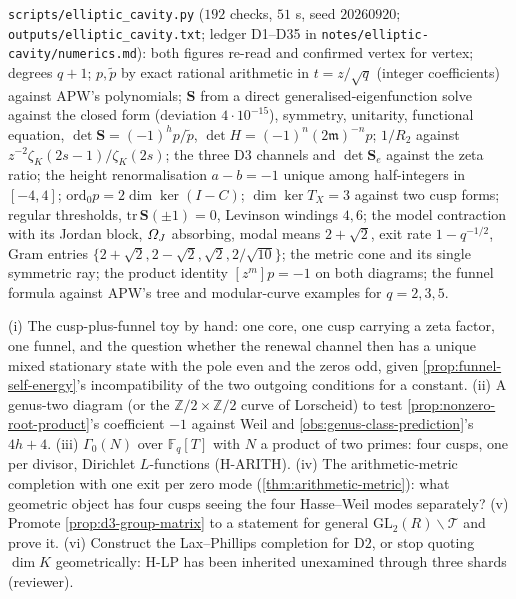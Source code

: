 \begin{numerical}
\label{num:elliptic-cavity}
\texttt{scripts/elliptic\_cavity.py} ($192$ checks, $51$ s, seed $20260920$; \texttt{outputs/elliptic\_cavity.txt};
ledger D1--D35 in \texttt{notes/elliptic-cavity/numerics.md}): both figures re-read and confirmed vertex for vertex;
degrees $q+1$; $p,\tilde p$ by exact rational arithmetic in $t = z/\sqrt q$ (integer coefficients) against APW's
polynomials; $\mathbf S$ from a direct generalised-eigenfunction solve against the closed form (deviation
$4\cdot10^{-15}$), symmetry, unitarity, functional equation, $\det\mathbf S = (-1)^hp/\tilde p$, $\det H = (-1)^n(2\mathfrak m)^{-n}p$;
$1/R_2$ against $z^{-2}\zeta_K(2s-1)/\zeta_K(2s)$; the three $\mathrm{D3}$ channels and $\det\mathbf S_e$ against the
zeta ratio; the height renormalisation $a-b = -1$ unique among half-integers in $[-4,4]$; $\mathrm{ord}_0p = 2\dim\ker(I-C)$;
$\dim\ker T_X = 3$ against two cusp forms; regular thresholds, $\mathrm{tr}\,\mathbf S(\pm1) = 0$, Levinson windings $4,6$;
the model contraction with its Jordan block, $\varOmega_J$ absorbing, modal means $2+\sqrt2$, exit rate $1-q^{-1/2}$,
Gram entries $\{2+\sqrt2,2-\sqrt2,\sqrt2,2/\sqrt{10}\}$; the metric cone and its single symmetric ray; the product
identity $[z^m]p = -1$ on both diagrams; the funnel formula against APW's tree and modular-curve examples for
$q = 2,3,5$.
\end{numerical}

\begin{observation}
\label{obs:elliptic-cavity-next}
(i) The cusp-plus-funnel toy by hand: one core, one cusp carrying a zeta factor, one funnel, and the question
whether the renewal channel then has a unique mixed stationary state with the pole even and the zeros odd, given
\cref{prop:funnel-self-energy}'s incompatibility of the two outgoing conditions for a constant. (ii) A genus-two
diagram (or the $\mathbb Z/2\times\mathbb Z/2$ curve of Lorscheid) to test \cref{prop:nonzero-root-product}'s coefficient
$-1$ against Weil and \cref{obs:genus-class-prediction}'s $4h+4$. (iii) $\Gamma_0(N)$ over $\mathbb F_q[T]$ with $N$ a
product of two primes: four cusps, one per divisor, Dirichlet $L$-functions (H-ARITH). (iv) The arithmetic-metric
completion with one exit per zero mode (\cref{thm:arithmetic-metric}): what geometric object has four cusps seeing
the four Hasse--Weil modes separately? (v) Promote \cref{prop:d3-group-matrix} to a statement for general
$\mathrm{GL}_2(R)\backslash\mathcal T$ and prove it. (vi) Construct the Lax--Phillips completion for $\mathrm{D2}$, or stop
quoting $\dim K$ geometrically: H-LP has been inherited unexamined through three shards (reviewer).
\end{observation}
